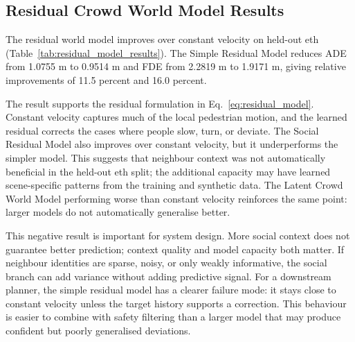 \documentclass[conference]{IEEEtran}
\begin{document}
\subsection{Residual Crowd World Model Results}

The residual world model improves over constant velocity on held-out eth
(Table~\ref{tab:residual_model_results}). The Simple Residual Model reduces ADE
from 1.0755 m to 0.9514 m and FDE from 2.2819 m to 1.9171 m, giving relative
improvements of 11.5 percent and 16.0 percent.

\begin{table}[H]
\centering
\caption{Residual crowd world model results on held-out eth after fine-tuning
with real ETH/UCY and filtered synthetic trajectories.}
\label{tab:residual_model_results}
\end{table}

The result supports the residual formulation in Eq.~\eqref{eq:residual_model}.
Constant velocity captures much of the local pedestrian motion, and the learned
residual corrects the cases where people slow, turn, or deviate. The Social
Residual Model also improves over constant velocity, but it underperforms the
simpler model. This suggests that neighbour context was not automatically
beneficial in the held-out eth split; the additional capacity may have learned
scene-specific patterns from the training and synthetic data. The Latent Crowd
World Model performing worse than constant velocity reinforces the same point:
larger models do not automatically generalise better.

This negative result is important for system design. More social context does
not guarantee better prediction; context quality and model capacity both
matter. If neighbour identities are sparse, noisy, or only weakly informative,
the social branch can add variance without adding predictive signal. For a
downstream planner, the simple residual model has a clearer failure mode: it
stays close to constant velocity unless the target history supports a
correction. This behaviour is easier to combine with safety filtering than a
larger model that may produce confident but poorly generalised deviations.
\end{document}
